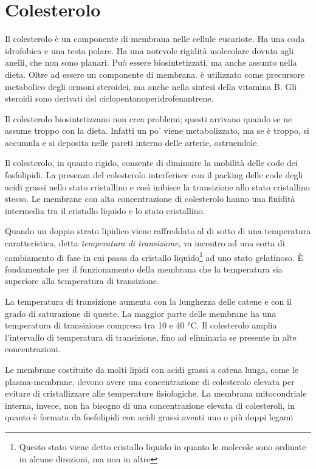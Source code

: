 \section{Colesterolo}


Il colesterolo è un componente di membrana nelle cellule eucariote. Ha una coda idrofobica e una testa polare. Ha una notevole rigidità molecolare dovuta agli anelli, che non sono planari. Può essere biosintetizzati, ma anche assunto nella dieta. Oltre ad essere un componente di membrana. è utilizzato come precursore metabolico degli ormoni steroidei, ma anche nella sintesi della vitamina B. Gli steroidi sono derivati del ciclopentanoperidrofenantrene.

Il colesterolo biosintetizzano non crea problemi; questi arrivano quando se ne assume troppo con la dieta. Infatti un po' viene metabolizzato, ma se è troppo, si accumula e si deposita nelle pareti interno delle arterie, ostruendole.

Il colesterolo, in quanto rigido, consente di diminuire la mobilità delle code dei fosfolipidi. La presenza del colesterolo interferisce con il packing delle code degli acidi grassi nello stato cristallino e così inibisce la transizione allo stato cristallino stesso.
Le membrane con alta concentrazione di colesterolo hanno una fluidità intermedia tra il cristallo liquido e lo stato cristallino.

Quando un doppio strato lipidico viene raffreddato al di sotto di una temperatura caratteristica, detta \emph{temperatura di transizione}, va incontro ad una sorta di cambiamento di fase in cui passa da cristallo liquido\footnote{Questo stato viene detto cristallo liquido in quanto le molecole sono ordinate in alcune direzioni, ma non in altre} ad uno stato gelatinoso.
È fondamentale per il funzionamento della membrana che la temperatura sia superiore alla temperatura di transizione.

La temperatura di transizione aumenta con la lunghezza delle catene e con il grado di saturazione di queste. La maggior parte delle membrane ha una temperatura di transizione compresa tra 10 e 40 °C.
Il colesterolo amplia l'intervallo di temperatura di transizione, fino ad eliminarla se presente in alte concentrazioni.

Le membrane costituite da molti lipidi con acidi grassi a catena lunga, come le plasma-membrane, devono avere una concentrazione di colesterolo elevata per evitare di cristallizzare alle temperature fisiologiche.
La membrana mitocondriale interna, invece, non ha bisogno di una concentrazione elevata di colesteroli, in quanto è formata da fosfolipidi con acidi grassi aventi uno o più doppi legami

